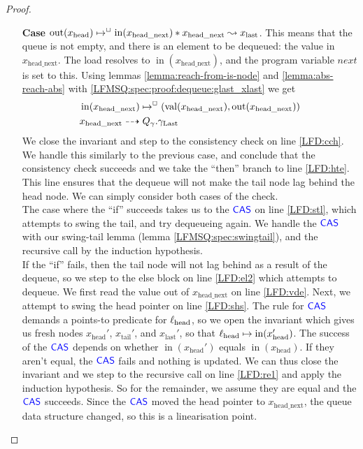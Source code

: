 \documentclass[a4paper, 10pt]{report}
\theoremstyle{definition}
\newcommand{\locN}[1]{\loc_{\mathrm{#1}}}
\newcommand{\lochead}{\locN{head}}
\newcommand{\nIn}[1]{\operatorname{in}(#1)}
\newcommand{\nVal}[1]{\operatorname{val}(#1)}
\newcommand{\nOut}[1]{\operatorname{out}(#1)}
\newcommand{\node}{x}
\newcommand{\nodeN}[1]{\node_{\mathrm{#1}}}
\newcommand{\nodehead}{\nodeN{head}}
\newcommand{\nodetail}{\nodeN{tail}}
\newcommand{\nodelast}{\nodeN{last}}
\newcommand{\nodeheadnext}{\nodeN{head\_next}}
\newcommand{\Qg}{Q_\gname}
\newcommand{\glast}{\gname_{\mathrm{Last}}}
\newcommand{\isNode}[1]{\nIn{#1} \mapsto^{\persistently} (\nVal{#1}, \nOut{#1})}
\newcommand{\reach}[2]{#1 \leadsto #2}
\newcommand{\ar}[2]{#1 \dashrightarrow #2}
\begin{document}
\begin{proof}
\begin{itemize}
\begin{itemize}
      \item[\textbf{Case}] $\nOut{\nodehead} \mapsto^{\persistently} \nIn{\nodeheadnext} \star \reach{\nodeheadnext}{\nodelast}$. This means that the queue is not empty, and there is an element to be dequeued: the value in $\nodeheadnext$. The load resolves to $\nIn{\nodeheadnext}$, and the program variable $next$ is set to this. Using lemmas \ref{lemma:reach-from-is-node} and \ref{lemma:abs-reach-abs} with \ref{LFMSQ:spec:proof:dequeue:glast_xlast} we get
      \begin{align}
        &\isNode{\nodeheadnext}\label{LFMSQ:spec:proof:dequeue:x_headnext_node}\\
        &\ar{\nodeheadnext}{\Qg.\glast}\label{LFMSQ:spec:proof:dequeue:x_headnext_glast}
      \end{align}
      We close the invariant and step to the consistency check on line \ref{LFD:cch}. We handle this similarly to the previous case, and conclude that the consistency check succeeds and we take the ``then'' branch to line \ref{LFD:hte}. This line ensures that the dequeue will not make the tail node lag behind the head node. We can simply consider both cases of the check.\\
      The case where the ``if'' succeeds takes us to the $\textsf{\color{blue} CAS}$ on line \ref{LFD:stl}, which attempts to swing the tail, and try dequeueing again. We handle the $\textsf{\color{blue} CAS}$ with our swing-tail lemma (lemma \ref{LFMSQ:spec:swingtail}), and the recursive call by the induction hypothesis.\\
      If the ``if'' fails, then the tail node will not lag behind as a result of the dequeue, so we step to the else block on line \ref{LFD:el2} which attempts to dequeue. We first read the value out of $\nodeheadnext$ on line \ref{LFD:vde}. Next, we attempt to swing the head pointer on line \ref{LFD:shs}. The rule for $\textsf{\color{blue} CAS}$ demands a points-to predicate for $\lochead$, so we open the invariant which gives us fresh nodes $\nodehead'$, $\nodetail'$, and $\nodelast'$, so that $\lochead \mapsto \nIn{\nodehead'}$. The success of the $\textsf{\color{blue} CAS}$ depends on whether $\nIn{\nodehead'}$ equals $\nIn{\nodehead}$. If they aren't equal, the $\textsf{\color{blue} CAS}$ fails and nothing is updated. We can thus close the invariant and we step to the recursive call on line \ref{LFD:re1} and apply the induction hypothesis. So for the remainder, we assume they are equal and the $\textsf{\color{blue} CAS}$ succeeds. Since the $\textsf{\color{blue} CAS}$ moved the head pointer to $\nodeheadnext$, the queue data structure changed, so this is a linearisation point.\\

\end{itemize}
\end{itemize}
\end{proof}
\end{document}

